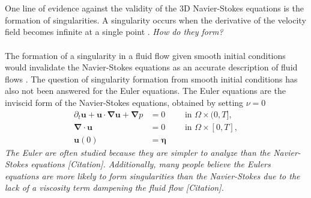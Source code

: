 \documentclass[12pt]{article}
\def\u{\boldsymbol u}
\def\bn{\boldsymbol \nabla}
\def\be{\boldsymbol \eta}
\numberwithin{equation}{section}
\begin{document}
\\~\\
One line of evidence against the validity of the 3D Navier-Stokes equations is the formation of singularities. A singularity occurs when the derivative of the velocity field becomes infinite at a single point \cite{moffatt_singularities_2019}. \textit{How do they form?}
\\~\\
The formation of a singularity in a fluid flow given smooth initial conditions would invalidate the Navier-Stokes equations as an accurate description of fluid flows \cite{protas_systematic_2022}. The question of singularity formation from smooth initial conditions has also not been answered for the Euler equations. The Euler equations are the inviscid form of the Navier-Stokes equations, obtained by setting $\nu=0$
\begin{subequations}\label{eq:Euler}
\begin{align}
\partial_t \u + \u\cdot \bn \u + \bn p &= 0 \qquad\text{ in } \Omega\times (0,T],\\
\boldsymbol\nabla \cdot \mathbf{u} &= 0 \qquad\text{ in } \Omega\times [0,T],\\
\u(0) &= \be
\end{align}
\end{subequations}
\textit{The Euler are often studied because they are simpler to analyze than the Navier-Stokes equations [Citation]. Additionally, many people believe the Eulers equations are more likely to form singularities than the Navier-Stokes due to the lack of a viscosity term dampening the fluid flow [Citation].}
\end{document}
